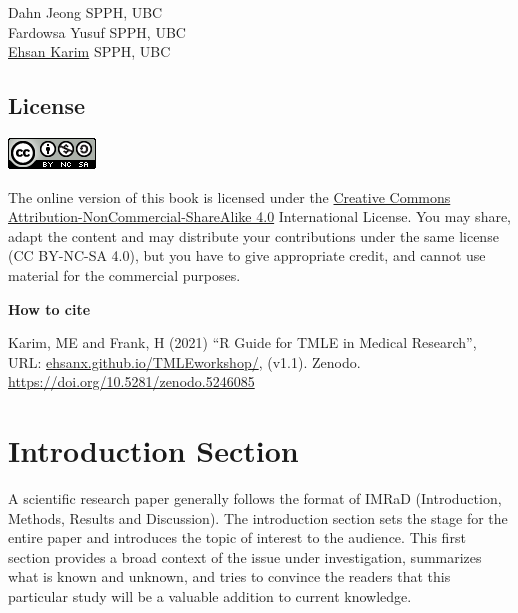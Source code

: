 \documentclass[
]{book}
\begin{document}
\begin{longtable}[]{@{}ll@{}}
\toprule
& \\
\midrule
\endhead
\bottomrule
\end{longtable}

Dahn Jeong \textbar{} SPPH, UBC \textbar{}\\
Fardowsa Yusuf \textbar{} SPPH, UBC \textbar{}\\
\href{https://ehsank.com/}{Ehsan Karim} \textbar{} SPPH, UBC \textbar{}

\hypertarget{license}{%
\section*{License}\label{license}}

\includegraphics[width=0.25\linewidth]{images/by-nc-sa}

The online version of this book is licensed under the \href{https://creativecommons.org/licenses/by-nc-sa/4.0/}{Creative Commons Attribution-NonCommercial-ShareAlike 4.0} International License. You may share, adapt the content and may distribute your contributions under the same license (CC BY-NC-SA 4.0), but you have to give appropriate credit, and cannot use material for the commercial purposes.

\begin{rmdcomment}
\textbf{How to cite}

Karim, ME and Frank, H (2021) ``R Guide for TMLE in Medical Research'',
URL:
\href{https://ehsanx.github.io/TMLEworkshop/}{ehsanx.github.io/TMLEworkshop/},
(v1.1). Zenodo. \url{https://doi.org/10.5281/zenodo.5246085}
\end{rmdcomment}

\hypertarget{introduction-section}{%
\chapter{Introduction Section}\label{introduction-section}}

A scientific research paper generally follows the format of IMRaD (Introduction, Methods, Results and Discussion). The introduction section sets the stage for the entire paper and introduces the topic of interest to the audience. This first section provides a broad context of the issue under investigation, summarizes what is known and unknown, and tries to convince the readers that this particular study will be a valuable addition to current knowledge.
\end{document}
